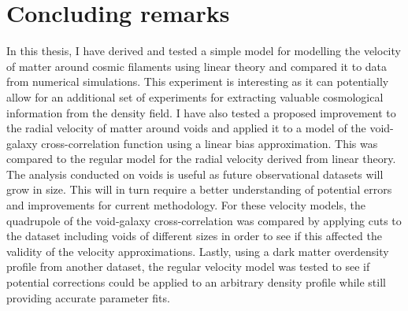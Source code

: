 \chapter{Concluding remarks}\label{sec:conclusion}
In this thesis, I have derived and tested a simple model for modelling the velocity of matter around cosmic filaments using linear theory and compared it to data from numerical simulations. This experiment is interesting as it can potentially allow for an additional set of experiments for extracting valuable cosmological information from the density field. I have also tested a proposed improvement to the radial velocity of matter around voids and applied it to a model of the void-galaxy cross-correlation function using a linear bias approximation. This was compared to the regular model for the radial velocity derived from linear theory. The analysis conducted on voids is useful as future observational datasets will grow in size. This will in turn require a better understanding of potential errors and improvements for current methodology. For these velocity models, the quadrupole of the void-galaxy cross-correlation was compared by applying cuts to the dataset including voids of different sizes in order to see if this affected the validity of the velocity approximations. Lastly, using a dark matter overdensity profile from another dataset, the regular velocity model was tested to see if potential corrections could be applied to an arbitrary density profile while still providing accurate parameter fits.

